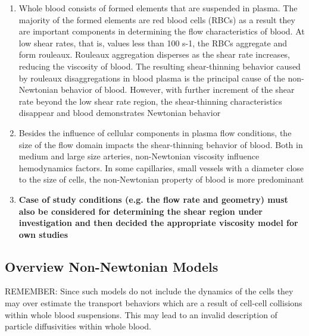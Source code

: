\documentclass[11pt,letterpaper]{article}
\begin{document}
\begin{enumerate}
\item Whole blood consists of formed elements that are suspended in plasma. The majority of the formed elements are red blood cells (RBCs) as a result they are important components in determining the flow characteristics of blood. At low shear rates, that is, values less than 100 s-1, the RBCs aggregate and form rouleaux. Rouleaux aggregation disperses as the shear rate increases, reducing the viscosity of blood. The resulting shear-thinning behavior caused by rouleaux disaggregations in blood plasma is the principal cause of the non-Newtonian behavior of blood. However, with further increment of the shear rate beyond the low shear rate region, the shear-thinning characteristics disappear and blood demonstrates Newtonian behavior \cite{Shibeshi2005_Carreau}
\item Besides the influence of cellular components in plasma flow conditions, the size of the flow domain impacts the shear-thinning behavior of blood. Both in medium and large size arteries, non-Newtonian viscosity influence hemodynamics factors. In some capillaries, small vessels with a diameter close to the size of cells, the non-Newtonian property of blood is more predominant \cite{Shibeshi2005_Carreau}
\item \textbf{Case of study conditions (e.g. the flow rate and geometry) must also be considered for determining the shear region under investigation and then decided the appropriate viscosity model for own studies} \cite{FuatYilmazandMehmetYasarGundogdu2008_largetable}
\end{enumerate}


\newpage
\subsection*{Overview Non-Newtonian Models
}

REMEMBER: Since such models do not include the dynamics of the cells they
may over estimate the transport behaviors which are a result of cell-cell collisions within
whole blood suspensions. This may lead to an invalid description of particle diffusivities within whole
blood.
\end{document}
